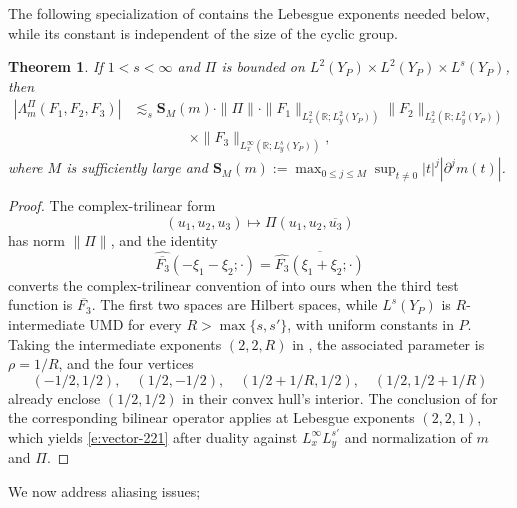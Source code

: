 \documentclass[12pt,leqno]{amsart}
\numberwithin{equation}{section}
\newtheorem{theorem}[equation]{Theorem}
\theoremstyle{definition}
\theoremstyle{plain}
\begin{document}
	The following specialization of \cite[Theorem 1.4]{DPLMV} contains
	the Lebesgue exponents needed below, while its constant is independent
	of the size of the cyclic group.
	\begin{theorem}\label{t:finiteBV}
		If $1<s<\infty$ and $\Pi$ is bounded on
		$L^2(Y_P)\times L^2(Y_P)\times L^{s}(Y_P)$, then
		\begin{equation}\label{e:vector-221}
			\begin{split}
				|\Lambda_m^\Pi(F_1,F_2,F_3)|
				&\lesssim_s  \mathbf{S}_M(m) \cdot \|\Pi\| \cdot
				\|F_1\|_{L_x^2(\mathbb R;L_y^2(Y_P))}
				\|F_2\|_{L_x^2(\mathbb R;L_y^2(Y_P))}\\
				&\qquad\qquad\times
				\|F_3\|_{L_x^\infty(\mathbb R;L_y^{s}(Y_P))},
			\end{split}
		\end{equation}
		where $M$ is sufficiently large and
		$\mathbf{S}_M(m):=\max_{0\leq j\leq M}
		\sup_{t\neq0}|t|^j|\partial^jm(t)|$.
	\end{theorem}
	\begin{proof}
		The complex-trilinear form
		\[
		(u_1,u_2,u_3)\longmapsto\Pi(u_1,u_2,\overline{u_3})
		\]
		has norm $\|\Pi\|$, and the identity
		\[
		\widehat{\overline{F_3}}(-\xi_1-\xi_2;\cdot)
		=\overline{\widehat{F_3}(\xi_1+\xi_2;\cdot)}
		\]
		converts the complex-trilinear convention of \cite{DPLMV} into ours
		when the third test function is $\overline{F_3}$.
		The first two spaces are Hilbert spaces, while $L^{s}(Y_P)$ is
		$R$-intermediate UMD for every $R>\max\{s,s'\}$, with uniform constants
		in $P$.
		Taking the intermediate exponents $(2,2,R)$ in
		\cite[Theorem 1.4]{DPLMV}, the associated parameter is $\rho=1/R$,
		and the four vertices
		\[
		(-1/2,1/2),\quad(1/2,-1/2),\quad
		(1/2+1/R,1/2),\quad(1/2,1/2+1/R)
		\]
		already enclose $(1/2,1/2)$ in their convex hull's interior.
		The conclusion of \cite[Theorem 1.4]{DPLMV} for the corresponding bilinear operator applies at Lebesgue exponents
		$(2,2,1)$, which yields \eqref{e:vector-221} after duality against
		$L_x^\infty L_y^{s'}$ and normalization of $m$ and $\Pi$.
	\end{proof}
	
	
	
	
	
	We now address aliasing issues;
	
	\medskip 
	
\end{document}
